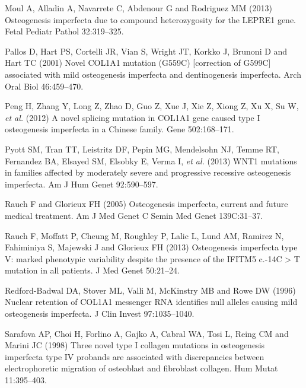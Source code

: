 \par Moul A, Alladin A, Navarrete C, Abdenour G and Rodriguez MM (2013)
                    Osteogenesis imperfecta due to compound heterozygosity for the LEPRE1 gene.
                    Fetal Pediatr Pathol 32:319–325.
\par Pallos D, Hart PS, Cortelli JR, Vian S, Wright JT, Korkko J, Brunoni
                    D and Hart TC (2001) Novel COL1A1 mutation (G559C) [correction of G599C]
                    associated with mild osteogenesis imperfecta and dentinogenesis imperfecta. Arch
                    Oral Biol 46:459–470.
\par Peng H, Zhang Y, Long Z, Zhao D, Guo Z, Xue J, Xie Z, Xiong Z, Xu X,
                    Su W, \textit{et al.} (2012) A novel splicing mutation in COL1A1 gene
                    caused type I osteogenesis imperfecta in a Chinese family. Gene
                    502:168–171.
\par Pyott SM, Tran TT, Leistritz DF, Pepin MG, Mendelsohn NJ, Temme RT,
                    Fernandez BA, Elsayed SM, Elsobky E, Verma I, \textit{et al.} (2013)
                    WNT1 mutations in families affected by moderately severe and progressive
                    recessive osteogenesis imperfecta. Am J Hum Genet 92:590–597.
\par Rauch F and Glorieux FH (2005) Osteogenesis imperfecta, current and
                    future medical treatment. Am J Med Genet C Semin Med Genet
                    139C:31–37.
\par Rauch F, Moffatt P, Cheung M, Roughley P, Lalic L, Lund AM, Ramirez
                    N, Fahiminiya S, Majewski J and Glorieux FH (2013) Osteogenesis imperfecta type
                    V: marked phenotypic variability despite the presence of the IFITM5 c.-14C
                    > T mutation in all patients. J Med Genet 50:21–24.
\par Redford-Badwal DA, Stover ML, Valli M, McKinstry MB and Rowe DW
                    (1996) Nuclear retention of COL1A1 messenger RNA identifies null alleles causing
                    mild osteogenesis imperfecta. J Clin Invest 97:1035–1040.
\par Sarafova AP, Choi H, Forlino A, Gajko A, Cabral WA, Tosi L, Reing CM
                    and Marini JC (1998) Three novel type I collagen mutations in osteogenesis
                    imperfecta type IV probands are associated with discrepancies between
                    electrophoretic migration of osteoblast and fibroblast collagen. Hum Mutat
                    11:395–403.
